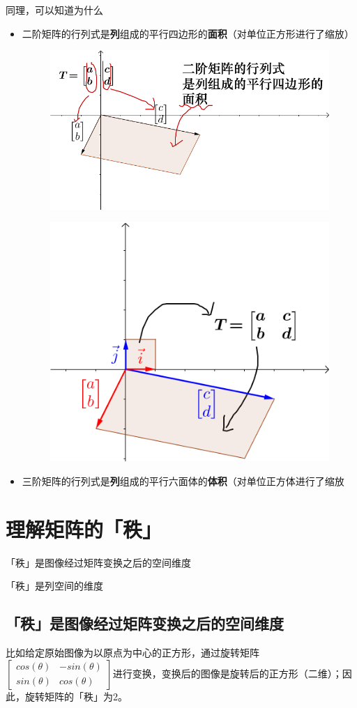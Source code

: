 \documentclass[12pt]{article}
\begin{document}
同理，可以知道为什么
\begin{itemize}
    \item 二阶矩阵的行列式是\textbf{列}组成的平行四边形的\textbf{面积}（对单位正方形进行了缩放）
\begin{figure}[H]
    \centering
    \includegraphics[width=.5\textwidth]{fig/UnderstandDeterminant_3.png}
\end{figure}
\begin{figure}[H]
    \centering
    \includegraphics[width=.5\textwidth]{fig/UnderstandDeterminant_4.png}
\end{figure}  
    \item 三阶矩阵的行列式是\textbf{列}组成的平行六面体的\textbf{体积}（对单位正方体进行了缩放
\end{itemize}

\section{理解矩阵的「秩」\cite{How_To_Understand_Rank_Of_Matrix}}
「秩」是图像经过矩阵变换之后的空间维度

「秩」是列空间的维度

\subsection{「秩」是图像经过矩阵变换之后的空间维度}
比如给定原始图像为以原点为中心的正方形，通过旋转矩阵$\begin{bmatrix}cos(\theta)&-sin(\theta)\\sin(\theta)&cos(\theta)\end{bmatrix}$进行变换，变换后的图像是旋转后的正方形（二维）；因此，旋转矩阵的「秩」为2。
\end{document}
